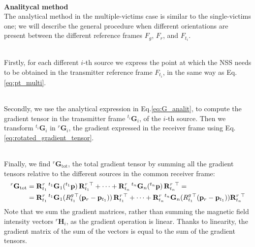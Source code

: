 \documentclass[main]{subfiles}
\begin{document}
\noindent\\
\textbf{Analitycal method}\noindent\\
The analytical method in the multiple-victims case is similar to the single-victims one;
we will describe the general procedure when different orientations
are present between the different reference frames $F_g$, $F_r$, and $F_{t_i}$.

\noindent\\
Firstly, for each different $i$-th source we express the point at which the NSS needs to be obtained
in the transmitter reference frame $F_{t_i}$, in the same way as Eq.\ref{eq:pt_multi}.

\noindent\\
Secondly, we use the analytical expression in Eq.\ref{eq:G_analit}, to compute the gradient tensor 
in the transmitter frame ${}^{t_i} \mathbf{G}_i$, of the $i$-th source.
Then we transform ${}^{t_i} \mathbf{G}_i$ in ${}^r \mathbf{G}_i$, the gradient expressed in the receiver frame using Eq.\ref{eq:rotated_gradient_tensor}.

\noindent\\
Finally, we find ${}^r \mathbf{G}_{\text{tot}}$, the total gradient tensor by summing all the gradient tensors
relative to the different sources in the common receiver frame:
\begin{align}
{}^r \mathbf{G}_{\text{tot}} &= 
\mathbf{R}^r_{t_1}  \, {}^{t_1}\mathbf{G}_1({}^{t_1} \mathbf{p}) \, {\mathbf{R}^r_{t_1}}\mkern-2mu^\top + \dots + \mathbf{R}^r_{t_n}  \, {}^{t_n}\mathbf{G}_n({}^{t_n} \mathbf{p}) \, {\mathbf{R}^r_{t_n}}\mkern-2mu^\top \nonumber = \\
&= 
\mathbf{R}^r_{t_1}  \, {}^{t_1}\mathbf{G}_1({R^g_{t_1}}\mkern-4mu^\top ( \mathbf{p}_r - \mathbf{p}_{t_1})) \, {\mathbf{R}^r_{t_1}}\mkern-3mu^\top + 
\cdots + \mathbf{R}^r_{t_n}   {}^{t_n}\mathbf{G}_n({R^g_{t_1}}\mkern-3mu^\top ( \mathbf{p}_r - \mathbf{p}_{t_1}))  {\mathbf{R}^r_{t_n}}\mkern-3mu^\top
\label{eq:G_tot}
\end{align}
Note that we sum the gradient matrices, rather than summing the 
magnetic field intensity vectors \( {}^r \mathbf{H}_i \), 
as the gradient operation is linear. 
Thanks to linearity, the gradient matrix of the sum of the vectors 
is equal to the sum of the gradient tensors.
 
\end{document}
